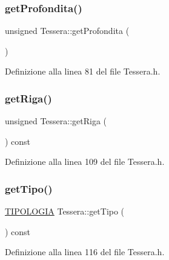 \subsubsection{\texorpdfstring{get\+Profondita()}{getProfondita()}}
{\footnotesize\ttfamily unsigned Tessera\+::get\+Profondita (\begin{DoxyParamCaption}{ }\end{DoxyParamCaption})\hspace{0.3cm}{\ttfamily [inline]}}



Definizione alla linea 81 del file Tessera.\+h.

\mbox{\label{class_tessera_ac30739e34616e28bce4d44c7619a7c14}} 
\subsubsection{\texorpdfstring{get\+Riga()}{getRiga()}}
{\footnotesize\ttfamily unsigned Tessera\+::get\+Riga (\begin{DoxyParamCaption}{ }\end{DoxyParamCaption}) const\hspace{0.3cm}{\ttfamily [inline]}}



Definizione alla linea 109 del file Tessera.\+h.

\mbox{\label{class_tessera_a6b65505187ca0905e14102fa6c9faefa}} 
\subsubsection{\texorpdfstring{get\+Tipo()}{getTipo()}}
{\footnotesize\ttfamily \hyperlink{_tessera_8h_a210ad8ee967d754da5f1a1b374663556}{T\+I\+P\+O\+L\+O\+G\+IA} Tessera\+::get\+Tipo (\begin{DoxyParamCaption}{ }\end{DoxyParamCaption}) const\hspace{0.3cm}{\ttfamily [inline]}}



Definizione alla linea 116 del file Tessera.\+h.

\mbox{\label{class_tessera_a770e53ac135c5938c770721a689a87c3}} 
